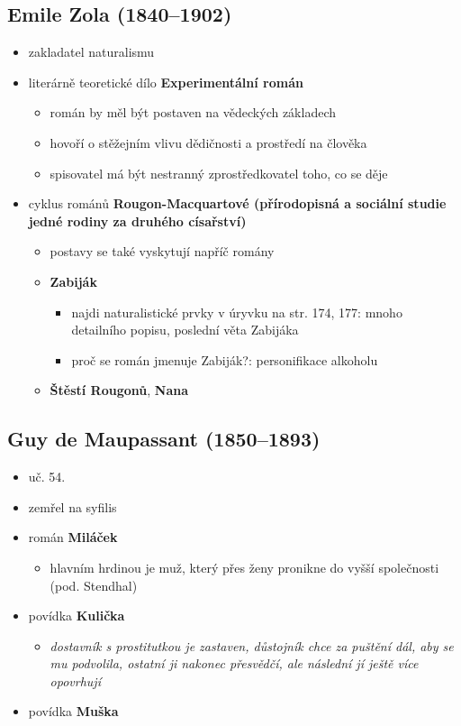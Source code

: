 \subsection{Emile Zola (1840--1902)}
\begin{itemize}
\item zakladatel naturalismu
\item literárně teoretické dílo \textbf{Experimentální román}
	\begin{itemize}
	\item román by měl být postaven na vědeckých základech
	\item hovoří o stěžejním vlivu dědičnosti a prostředí na člověka
	\item spisovatel má být nestranný zprostředkovatel toho, co se děje
	\end{itemize}
\item cyklus románů \textbf{Rougon-Macquartové (přírodopisná a sociální studie jedné rodiny za druhého císařství)}
	\begin{itemize}
	\item postavy se také vyskytují napříč romány
	\item \textbf{Zabiják}
		\begin{itemize}
		\item najdi naturalistické prvky v úryvku na str. 174, 177: mnoho detailního popisu, poslední věta Zabijáka
		\item proč se román jmenuje Zabiják?: personifikace alkoholu
		\end{itemize}
	\item \textbf{Štěstí Rougonů}, \textbf{Nana}
	\end{itemize}
\end{itemize}

\subsection{Guy de Maupassant (1850--1893)}
\begin{itemize}
\item uč. 54.
\item zemřel na syfilis
\item román \textbf{Miláček}
	\begin{itemize}
	\item hlavním hrdinou je muž, který přes ženy pronikne do vyšší společnosti (pod. Stendhal)
	\end{itemize}
\item povídka \textbf{Kulička}
	\begin{itemize}
	\item \textit{dostavník s prostitutkou je zastaven, důstojník chce za puštění dál, aby se mu podvolila, ostatní ji nakonec přesvědčí, ale následní jí ještě více opovrhují}
	\end{itemize}
\item povídka \textbf{Muška}
\end{itemize}

